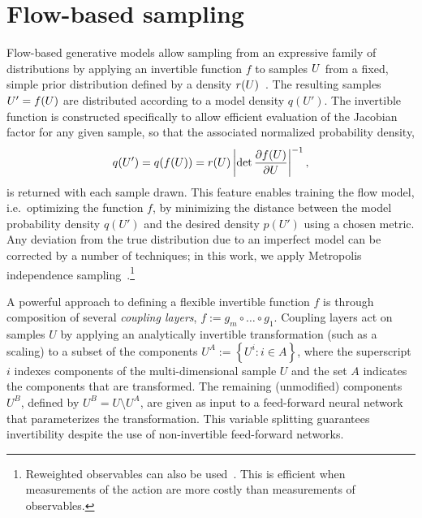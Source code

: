 \section{Flow-based sampling}
Flow-based generative models allow sampling from an expressive family of distributions by applying an invertible function $f$ to samples $U$ from a fixed, simple prior distribution defined by a density $r(U)$~\cite{papamakarios2019normalizing}. The resulting samples $U' = f(U)$ are distributed according to a model density $q(U')$. The invertible function is constructed specifically to allow efficient evaluation of the Jacobian factor for any given sample, so that the associated normalized probability density,
%
\begin{equation} \label{eqn:norm-flow}
  q(U') = q(f(U)) = r(U) \left| \det \frac{\partial f(U)}{\partial U} \right|^{-1},
\end{equation}
%
is returned with each sample drawn. This feature enables training the flow model, i.e.~optimizing the function $f$, by minimizing the distance between the model probability density $q(U')$ and the desired density $p(U')$ using a chosen metric. Any deviation from the true distribution due to an imperfect model can be corrected by a number of techniques; in this work, we apply Metropolis independence sampling~\cite{Albergo2019FlowMCMC}.\footnote{Reweighted observables can also be used~\cite{Ferrenberg:1988yz,mller2018neural}. This is efficient when measurements of the action are more costly than measurements of observables.}

A powerful approach to defining a flexible invertible function $f$ is through composition of several \emph{coupling layers}, $f := g_m \circ \dots \circ g_1$. Coupling layers act on samples $U$ by applying an analytically invertible transformation (such as a scaling) to a subset of the components $U^{A} := \left\{ U^{i} : i \in A \right\}$, where the superscript $i$ indexes components of the multi-dimensional sample $U$ and the set $A$ indicates the components that are transformed. The remaining (unmodified) components $U^B$, defined by $U^B = U \setminus U^A$, are given as input to a feed-forward neural network that parameterizes the transformation. This variable splitting guarantees invertibility despite the use of non-invertible feed-forward networks.
